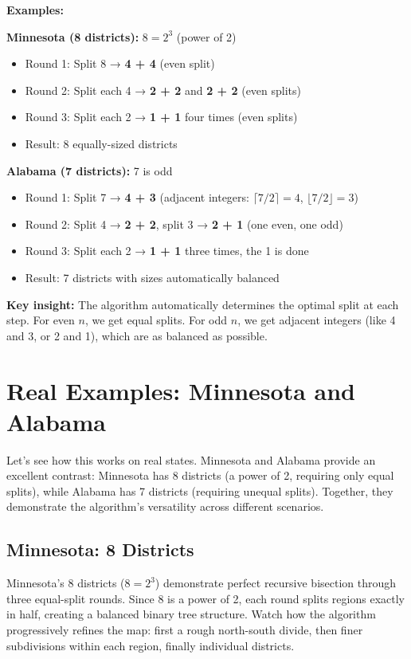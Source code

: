 \documentclass[11pt]{article}
\begin{document}
\vspace{1em}
\textbf{Examples:}

\textbf{Minnesota (8 districts):} $8 = 2^3$ (power of 2)
\begin{itemize}
\item Round 1: Split 8 → \textbf{4 + 4} (even split)
\item Round 2: Split each 4 → \textbf{2 + 2} and \textbf{2 + 2} (even splits)
\item Round 3: Split each 2 → \textbf{1 + 1} four times (even splits)
\item Result: 8 equally-sized districts
\end{itemize}

\textbf{Alabama (7 districts):} 7 is odd
\begin{itemize}
\item Round 1: Split 7 → \textbf{4 + 3} (adjacent integers: $\lceil 7/2 \rceil = 4$, $\lfloor 7/2 \rfloor = 3$)
\item Round 2: Split 4 → \textbf{2 + 2}, split 3 → \textbf{2 + 1} (one even, one odd)
\item Round 3: Split each 2 → \textbf{1 + 1} three times, the 1 is done
\item Result: 7 districts with sizes automatically balanced
\end{itemize}

\textbf{Key insight:} The algorithm automatically determines the optimal split at each step. For even $n$, we get equal splits. For odd $n$, we get adjacent integers (like 4 and 3, or 2 and 1), which are as balanced as possible.

\section{Real Examples: Minnesota and Alabama}

Let's see how this works on real states. Minnesota and Alabama provide an excellent contrast: Minnesota has 8 districts (a power of 2, requiring only equal splits), while Alabama has 7 districts (requiring unequal splits). Together, they demonstrate the algorithm's versatility across different scenarios.

\subsection{Minnesota: 8 Districts}

Minnesota's 8 districts ($8 = 2^3$) demonstrate perfect recursive bisection through three equal-split rounds. Since 8 is a power of 2, each round splits regions exactly in half, creating a balanced binary tree structure. Watch how the algorithm progressively refines the map: first a rough north-south divide, then finer subdivisions within each region, finally individual districts.
\end{document}
